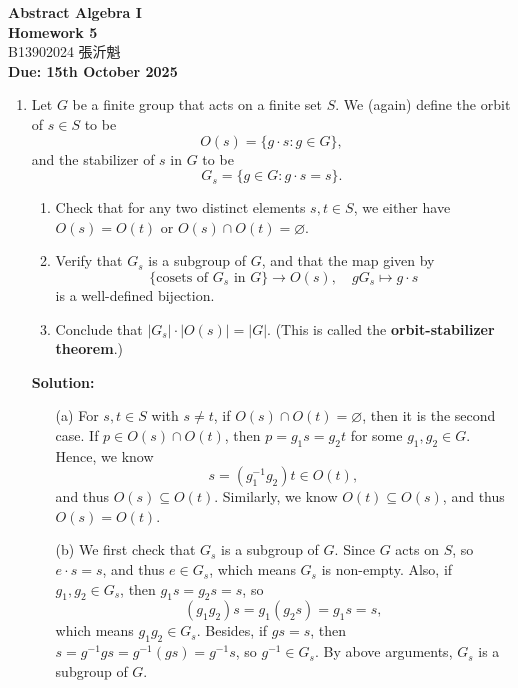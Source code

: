 \documentclass[a4paper,12pt]{article}
\begin{document}
\begin{center}
    \Large \textbf{Abstract Algebra I} \\[1em]
    \large \textbf{Homework 5} \\[0.5em]
    B13902024 張沂魁 \\
    \textbf{Due: 15th October 2025}
\end{center}

\bigskip

\begin{enumerate}
    \item Let $G$ be a finite group that acts on a finite set $S$. We (again) define the orbit of $s \in S$ to be
    \[
        O(s) = \{ g \cdot s : g \in G \},
    \]
    and the stabilizer of $s$ in $G$ to be
    \[
        G_s = \{ g \in G : g \cdot s = s \}.
    \]
    \begin{enumerate}[label=(\alph*)]
        \item Check that for any two distinct elements $s, t \in S$, we either have $O(s) = O(t)$ or $O(s) \cap O(t) = \varnothing$.

        \item Verify that $G_s$ is a subgroup of $G$, and that the map given by
        \[
            \{\text{cosets of } G_s \text{ in } G\} \to O(s), \quad gG_s \mapsto g \cdot s
        \]
        is a well-defined bijection.

        \item Conclude that $|G_s| \cdot |O(s)| = |G|$. (This is called the \textbf{orbit-stabilizer theorem}.)
    \end{enumerate}
    \textbf{Solution:} 
    \begin{itemize}
        \item [(a)] For \(s , t \in S\) with \(s \neq t\), if \(O(s) \cap O(t) = \varnothing \), then it is the second case. If \(p \in O(s) \cap O(t)\), then \(p = g_1 s = g_2 t\) for some \(g_1, g_2 \in G\). Hence, we know 
        \[
            s = \left( g_1^{-1} g_2 \right) t \in O(t),
        \] and thus \(O(s) \subseteq O(t)\). Similarly, we know \(O(t) \subseteq O(s)\), and thus \(O(s) = O(t)\).   
        \item [(b)] We first check that \(G_s\) is a subgroup of \(G\). Since \(G\) acts on \(S\), so \(e \cdot s = s\), and thus \(e \in G_s\), which means \(G_s\) is non-empty. Also, if \(g_1, g_2 \in G_s\), then \(g_1 s = g_2 s = s \), so
        \[
            \left( g_1 g_2 \right)s = g_1 \left( g_2 s \right) = g_1 s = s, 
        \] which means \(g_1 g_2 \in G_s \). Besides, if \(gs = s\), then \(s = g^{-1} g s = g^{-1} (gs) = g^{-1} s\), so \(g^{-1} \in G_s\). By above arguments, \(G_s\) is a subgroup of \(G\).    
        

\end{itemize}
\end{enumerate}
\end{document}
